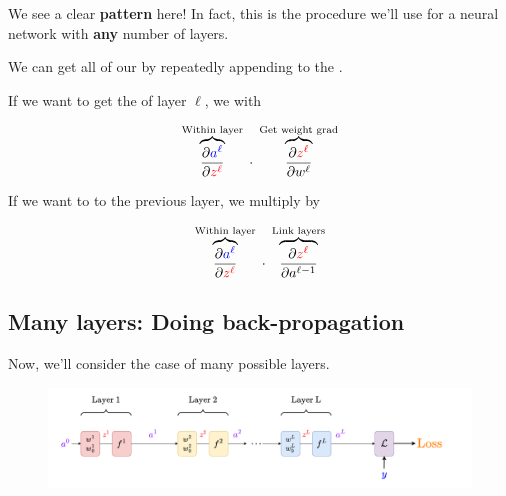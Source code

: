         We see a clear \textbf{pattern} here! In fact, this is the procedure we'll use for a neural network with \textbf{any} number of layers.\\
        
        \begin{concept}
            We can get all of our  by repeatedly appending to the .
            
            If we want to get the  of layer $\ell$, we  with
            
            \begin{equation*}
                \overbrace{
                    \frac{\partial \textcolor{blue}{a^\ell}}{\partial \textcolor{red}{z^\ell}}
                }^{\text{Within layer}}
                    \; \cdot \;
                \overbrace{
                    \frac{\partial \textcolor{red}{z^\ell}}{\partial w^\ell}
                }^{\text{Get weight grad}}
            \end{equation*}
            
            If we want to  to the previous layer, we  multiply by
            
            \begin{equation*}
                \overbrace{
                    \frac{\partial \textcolor{blue}{a^\ell}}{\partial \textcolor{red}{z^\ell}}
                }^{\text{Within layer}}
                    \; \cdot \;
                \overbrace{
                    \frac{\partial \textcolor{red}{z^\ell}}{\partial a^{\ell-1}}
                }^{\text{Link layers}}
            \end{equation*}
            
        \end{concept}
        
    \secdiv
    
    \subsection{Many layers: Doing back-propagation}
    
        Now, we'll consider the case of many possible layers.
            
        \phantom{ }
            
        \begin{figure}[H]
            \centering
            \includegraphics[width=180mm,scale=0.4]{images/nn_1_5_images/network_bp.png}
        \end{figure}
        
